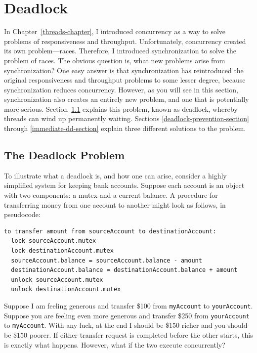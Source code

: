 \section{Deadlock}\label{deadlock-section}

In Chapter~\ref{threads-chapter}, I introduced concurrency as a way to solve
problems of responsiveness and throughput.  Unfortunately, concurrency
created its own problem---races.  Therefore, I introduced
synchronization to solve the problem of races.  The obvious question is, what new problems arise
from synchronization?  One easy answer is that synchronization has
reintroduced the original responsiveness and throughput problems to some lesser degree, because
synchronization reduces concurrency.  However, as you will see in this
section, synchronization also creates an entirely new problem, and one that is
potentially more serious.  Section~\ref{deadlock-problem-section}
explains this problem, known as deadlock, whereby threads can wind up
permanently waiting.  Sections
\ref{deadlock-prevention-section} through \ref{immediate-dd-section}
explain three different solutions to the problem.

\subsection{The Deadlock Problem}\label{deadlock-problem-section}

To illustrate what a deadlock is, and how one can arise,
consider a highly simplified system for keeping bank accounts.
Suppose each account is an object with two components: a mutex and a
current balance.  A procedure for transferring money from one account
to another might look as follows, in pseudocode:
\begin{verbatim}
to transfer amount from sourceAccount to destinationAccount:
  lock sourceAccount.mutex
  lock destinationAccount.mutex
  sourceAccount.balance = sourceAccount.balance - amount
  destinationAccount.balance = destinationAccount.balance + amount
  unlock sourceAccount.mutex
  unlock destinationAccount.mutex
\end{verbatim}

Suppose I am feeling generous and transfer \$100 from \verb|myAccount|
to \verb|yourAccount|.  Suppose you are feeling even more generous
and transfer \$250 from \verb|yourAccount| to \verb|myAccount|.  With
any luck, at the end I should be \$150 richer and you should be \$150
poorer.  If either transfer request is completed before the other
starts, this is exactly what happens.  However, what if the two execute
concurrently?

